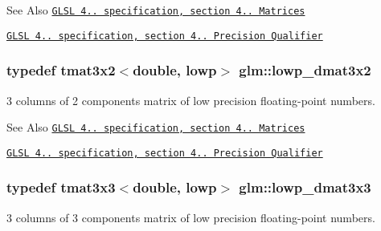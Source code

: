 \begin{DoxySeeAlso}{See Also}
\href{http://www.opengl.org/registry/doc/GLSLangSpec.4.20.8.pdf}{\tt G\-L\-S\-L 4.. specification, section 4.. Matrices} 

\href{http://www.opengl.org/registry/doc/GLSLangSpec.4.20.8.pdf}{\tt G\-L\-S\-L 4.. specification, section 4.. Precision Qualifier} 
\end{DoxySeeAlso}
\hypertarget{group__core__precision_gac90dba962673ae315e5504a362d39b1c}{
\subsubsection[{lowp\-\_\-dmat3x2}]{\setlength{\rightskip}{0pt plus 5cm}typedef tmat3x2$<$double, lowp$>$ {\bf glm\-::lowp\-\_\-dmat3x2}}}\label{group__core__precision_gac90dba962673ae315e5504a362d39b1c}
3 columns of 2 components matrix of low precision floating-\/point numbers.

\begin{DoxySeeAlso}{See Also}
\href{http://www.opengl.org/registry/doc/GLSLangSpec.4.20.8.pdf}{\tt G\-L\-S\-L 4.. specification, section 4.. Matrices} 

\href{http://www.opengl.org/registry/doc/GLSLangSpec.4.20.8.pdf}{\tt G\-L\-S\-L 4.. specification, section 4.. Precision Qualifier} 
\end{DoxySeeAlso}
\hypertarget{group__core__precision_ga8cc302ca16a2ae1708143c85d50de0e7}{
\subsubsection[{lowp\-\_\-dmat3x3}]{\setlength{\rightskip}{0pt plus 5cm}typedef tmat3x3$<$double, lowp$>$ {\bf glm\-::lowp\-\_\-dmat3x3}}}\label{group__core__precision_ga8cc302ca16a2ae1708143c85d50de0e7}
3 columns of 3 components matrix of low precision floating-\/point numbers.


